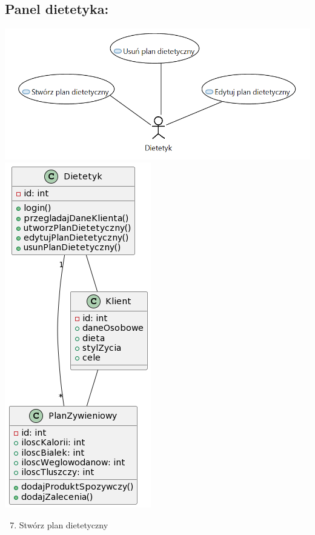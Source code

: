 \documentclass[
]{article}
\providecommand{\tightlist}{%
  \setlength{\itemsep}{0pt}\setlength{\parskip}{0pt}}
\begin{document}
\hypertarget{h.ks35fdzbeyq3}{%
\subsection{\texorpdfstring{{Panel
dietetyka:}}{Panel dietetyka:}}\label{h.ks35fdzbeyq3}}

{\includegraphics{diagrams/use_cases/dietetyk.png}}
{\includegraphics{diagrams/class/dietetyk.png}}

\begin{enumerate}
\setcounter{enumi}{6}
\tightlist
\item
  {Stwórz plan dietetyczny}
\end{enumerate}
\end{document}
